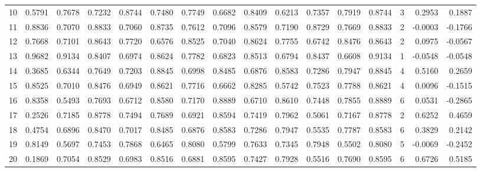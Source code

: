 \begin{tabular}{lrrrrrrrrrrrrrrr}
10  &      0.5791 &  0.7678 &  0.7232 &  0.8744 &  0.7480 &  0.7749 &  0.6682 &  0.8409 &  0.6213 &  0.7357 &   0.7919 &     0.8744 &      3 &                    0.2953 &                     0.1887 \\
11  &      0.8836 &  0.7070 &  0.8833 &  0.7060 &  0.8735 &  0.7612 &  0.7096 &  0.8579 &  0.7190 &  0.8729 &   0.7669 &     0.8833 &      2 &                   -0.0003 &                    -0.1766 \\
12  &      0.7668 &  0.7101 &  0.8643 &  0.7720 &  0.6576 &  0.8525 &  0.7040 &  0.8624 &  0.7755 &  0.6742 &   0.8476 &     0.8643 &      2 &                    0.0975 &                    -0.0567 \\
13  &      0.9682 &  0.9134 &  0.8407 &  0.6974 &  0.8624 &  0.7782 &  0.6823 &  0.8513 &  0.6794 &  0.8437 &   0.6608 &     0.9134 &      1 &                   -0.0548 &                    -0.0548 \\
14  &      0.3685 &  0.6344 &  0.7649 &  0.7203 &  0.8845 &  0.6998 &  0.8485 &  0.6876 &  0.8583 &  0.7286 &   0.7947 &     0.8845 &      4 &                    0.5160 &                     0.2659 \\
15  &      0.8525 &  0.7010 &  0.8476 &  0.6949 &  0.8621 &  0.7716 &  0.6662 &  0.8285 &  0.5742 &  0.7523 &   0.7788 &     0.8621 &      4 &                    0.0096 &                    -0.1515 \\
16  &      0.8358 &  0.5493 &  0.7693 &  0.6712 &  0.8580 &  0.7170 &  0.8889 &  0.6710 &  0.8610 &  0.7448 &   0.7855 &     0.8889 &      6 &                    0.0531 &                    -0.2865 \\
17  &      0.2526 &  0.7185 &  0.8778 &  0.7494 &  0.7689 &  0.6921 &  0.8594 &  0.7419 &  0.7962 &  0.5061 &   0.7167 &     0.8778 &      2 &                    0.6252 &                     0.4659 \\
18  &      0.4754 &  0.6896 &  0.8470 &  0.7017 &  0.8485 &  0.6876 &  0.8583 &  0.7286 &  0.7947 &  0.5535 &   0.7787 &     0.8583 &      6 &                    0.3829 &                     0.2142 \\
19  &      0.8149 &  0.5697 &  0.7453 &  0.7868 &  0.6465 &  0.8080 &  0.5799 &  0.7633 &  0.7345 &  0.7948 &   0.5502 &     0.8080 &      5 &                   -0.0069 &                    -0.2452 \\
20  &      0.1869 &  0.7054 &  0.8529 &  0.6983 &  0.8516 &  0.6881 &  0.8595 &  0.7427 &  0.7928 &  0.5516 &   0.7690 &     0.8595 &      6 &                    0.6726 &                     0.5185 \\

\end{tabular}
